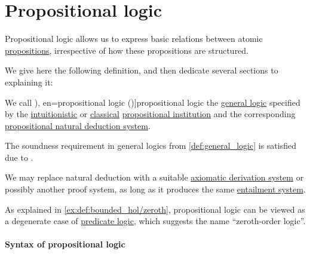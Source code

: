 \section{Propositional logic}\label{sec:propositional_logic}

Propositional logic allows us to express basic relations between atomic \hyperref[con:proposition]{propositions}, irrespective of how these propositions are structured.

We give here the following definition, and then dedicate several sections to explaining it:
\begin{definition}\label{def:propositional_logic}\mimprovised
  We call \term[ru=логика высказываний (\cite[10]{Герасимов2014Вычислимость}), en=propositional logic (\cite[4]{Kleene2002Logic})]{propositional logic} the \hyperref[def:general_logic]{general logic} specified by the \hyperref[def:truth_value_algebra/intuitionistic]{intuitionistic} or \hyperref[def:truth_value_algebra/classical]{classical} \hyperref[def:propositional_institution]{propositional institution} and the corresponding \hyperref[def:propositional_natural_deduction]{propositional natural deduction system}.
\end{definition}
\begin{comments}
  \item The soundness requirement in general logics from \cref{def:general_logic} is satisfied due to .

  \item We may replace natural deduction with a suitable \hyperref[def:propositional_axiomatic_derivation_system]{axiomatic derivation system} or possibly another proof system, as long as it produces the same \hyperref[def:entailment_system]{entailment system}.

  \item As explained in \cref{ex:def:bounded_hol/zeroth}, propositional logic can be viewed as a degenerate case of \hyperref[con:predicate_logic]{predicate logic}, which suggests the name \enquote{zeroth-order logic}.
\end{comments}

\paragraph{Syntax of propositional logic}

